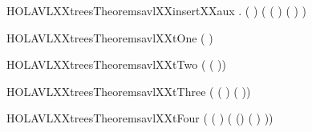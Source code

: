 \newcommand{\HOLAVLXXtreesTheoremsavlXXcompleteXXavl}{\UseVerbatim{HOLAVLXXtreesTheoremsavlXXcompleteXXavl}}
\begin{SaveVerbatim}{HOLAVLXXtreesTheoremsavlXXinsertXXaux}
\HOLTokenTurnstile{} \HOLSymConst{\HOLTokenForall{}}  .
       \HOLSymConst{\HOLTokenImp{}}
      (   ) \HOLSymConst{\HOLTokenConj{}}
     ( (   ) \HOLSymConst{=}   \HOLSymConst{\HOLTokenDisj{}}
       (   ) \HOLSymConst{=}   \HOLSymConst{\ensuremath{+}} )
\end{SaveVerbatim}
\newcommand{\HOLAVLXXtreesTheoremsavlXXinsertXXaux}{\UseVerbatim{HOLAVLXXtreesTheoremsavlXXinsertXXaux}}
\begin{SaveVerbatim}{HOLAVLXXtreesTheoremsavlXXtOne}
\HOLTokenTurnstile{}  (     )
\end{SaveVerbatim}
\newcommand{\HOLAVLXXtreesTheoremsavlXXtOne}{\UseVerbatim{HOLAVLXXtreesTheoremsavlXXtOne}}
\begin{SaveVerbatim}{HOLAVLXXtreesTheoremsavlXXtTwo}
\HOLTokenTurnstile{}  (     (     ))
\end{SaveVerbatim}
\newcommand{\HOLAVLXXtreesTheoremsavlXXtTwo}{\UseVerbatim{HOLAVLXXtreesTheoremsavlXXtTwo}}
\begin{SaveVerbatim}{HOLAVLXXtreesTheoremsavlXXtThree}
\HOLTokenTurnstile{}  (    (     ) (     ))
\end{SaveVerbatim}
\newcommand{\HOLAVLXXtreesTheoremsavlXXtThree}{\UseVerbatim{HOLAVLXXtreesTheoremsavlXXtThree}}
\begin{SaveVerbatim}{HOLAVLXXtreesTheoremsavlXXtFour}
\HOLTokenTurnstile{} 
     (    (     )
        ( (\HOLSymConst{\ensuremath{-}})   (     ) ))
\end{SaveVerbatim}
